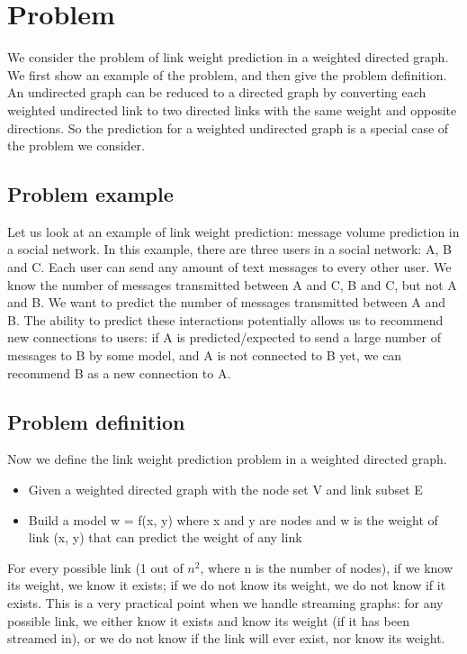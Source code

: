 \documentclass{article} %
\begin{document}
\section{Problem}
We consider the problem of link weight prediction in a weighted directed graph.
We first show an example of the problem,
and then give the problem definition.
An undirected graph can be reduced to a directed graph by converting each weighted undirected link to two directed links with the same weight and opposite directions.
So the prediction for a weighted undirected graph is a special case of the problem we consider.

\subsection{Problem example}
Let us look at an example of link weight prediction: message volume prediction in a social network.
In this example, there are three users in a social network: A, B and C.
Each user can send any amount of text messages to every other user.
We know the number of messages transmitted between A and C, B and C, but not A and B.
We want to predict the number of messages transmitted between A and B.
The ability to predict these interactions potentially allows us to recommend new connections to users:
if A is predicted/expected to send a large number of messages to B by some model,
and A is not connected to B yet,
we can recommend B as a new connection to A.

\subsection{Problem definition}
Now we define the link weight prediction problem in a weighted directed graph.
\begin{itemize}
	\item Given a weighted directed graph with the node set V and link subset E
	\item Build a model w = f(x, y) where x and y are nodes and w is the weight of link (x, y) that can predict the weight of any link
\end{itemize}
For every possible link (1 out of $ n^2 $, where n is the number of nodes), 
if we know its weight, we know it exists;
if we do not know its weight, we do not know if it exists.
This is a very practical point when we handle streaming graphs:
for any possible link,
we either know it exists and know its weight (if it has been streamed in), or we do not know if the link will ever exist, nor know its weight.
\end{document}
